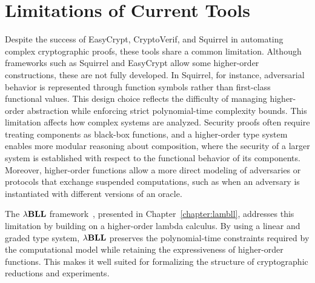 

\section{Limitations of Current Tools}
Despite the success of EasyCrypt, CryptoVerif, and Squirrel in automating complex cryptographic proofs, these tools share a common limitation. Although frameworks such as Squirrel and EasyCrypt allow some higher-order constructions, these are not fully developed. In Squirrel, for instance, adversarial behavior is represented through function symbols rather than first-class functional values. This design choice reflects the difficulty of managing higher-order abstraction while enforcing strict polynomial-time complexity bounds. This limitation affects how complex systems are analyzed. Security proofs often require treating components as black-box functions, and a higher-order type system enables more modular reasoning about composition, where the security of a larger system is established with respect to the functional behavior of its components. Moreover, higher-order functions allow a more direct modeling of adversaries or protocols that exchange suspended computations, such as when an adversary is instantiated with different versions of an oracle.

The ${\lambda}\mathbf{BLL}$ framework~\cite{lago2024computationalindistinguishabilitylogicalrelations}, presented in Chapter~\ref{chapter:lambll}, addresses this limitation by building on a higher-order lambda calculus. By using a linear and graded type system, ${\lambda}\mathbf{BLL}$ preserves the polynomial-time constraints required by the computational model while retaining the expressiveness of higher-order functions. This makes it well suited for formalizing the structure of cryptographic reductions and experiments.